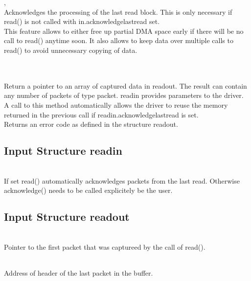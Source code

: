 \device, \\
Acknowledges the processing of the last read block. This is only necessary if \textsf{\prefix read()} is not called with 
\textsf{in.acknowledge\tu last\tu read} set.\\
This feature allows to either free up partial DMA space early if there will be no call to \textsf{\prefix read()} anytime soon. 
It also allows to keep data over multiple calls to \textsf{\prefix read()} to avoid unnecessary copying of data. \par

\device {} \\ \\
Return a pointer to an array of captured data in \textsf{read\tu out}. 
The result can contain any number of packets of type \textsf{\prefix packet}.
\textsf{read\tu in} provides parameters to the driver. 
A call to this method automatically allows the driver to reuse the memory returned in the previous call if \textsf{read\tu in.acknowledge\tu last\tu read} is set.\\
Returns an error code as defined in the structure \textsf{\prefix read\tu out}.

\subsection{Input Structure \prefix read\tu in}

	\\
	If set \textsf{\prefix read()} automatically acknowledges packets from the last read. 
	Otherwise \textsf{\prefix acknowledge()} needs to be called explicitely be the user. 

\subsection{Input Structure \prefix read\tu out}
	\\
	Pointer to the first packet that was captureed by the call of \textsf{\prefix read()}.\par

	\\
	Address of header of the last packet in the buffer.\par

